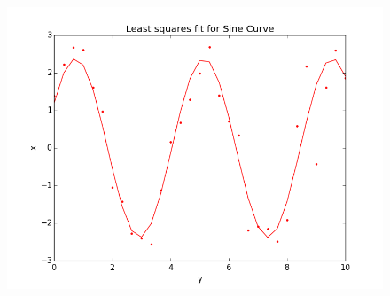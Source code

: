 \documentclass[11pt]{article}
\begin{document}
\begin{figure}[ht]
\centering
\includegraphics[scale=.5]{sincurve.png}
\end{figure}
\end{document}
